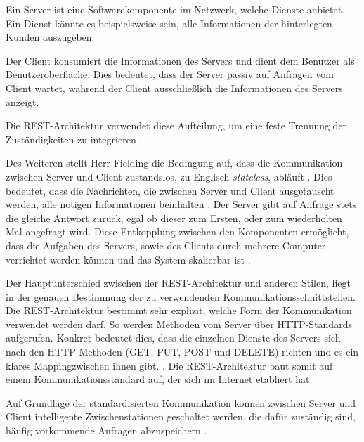 Ein Server ist eine Softwarekomponente im Netzwerk, welche Dienste anbietet. Ein Dienst könnte es beispielsweise sein, alle Informationen der hinterlegten Kunden auszugeben.

Der Client konsumiert die Informationen des Servers und dient dem Benutzer als Benutzeroberfläche. Dies bedeutet, dass der Server passiv auf Anfragen vom Client wartet, während der Client ausschließlich die Informationen des Servers anzeigt. 

Die REST-Architektur verwendet diese Aufteilung, um eine feste Trennung der Zuständigkeiten zu integrieren \parencite[vgl.][S. 78]{fielding_architectural_2000}.

Des Weiteren stellt Herr Fielding die Bedingung auf, dass die Kommunikation zwischen Server und Client zustandslos, zu Englisch \textit{stateless}, abläuft \parencite[][S. 78]{fielding_architectural_2000}. Dies bedeutet, dass die Nachrichten, die zwischen Server und Client ausgetauscht werden, alle nötigen Informationen beinhalten \parencite[][S. 128]{starke_effektive_2015}. Der Server gibt auf Anfrage stets die gleiche Antwort zurück, egal ob dieser zum Ersten, oder zum wiederholten Mal angefragt wird. Diese Entkopplung zwischen den Komponenten ermöglicht, dass die Aufgaben des Servers, sowie des Clients durch mehrere Computer verrichtet werden können und das System skalierbar ist \parencite[][S. 79]{fielding_architectural_2000}.

Der Hauptunterschied zwischen der REST-Architektur und anderen Stilen, liegt in der genauen Bestimmung der zu verwendenden Kommunikationsschnittstellen. Die REST-Architektur bestimmt sehr explizit, welche Form der Kommunikation verwendet werden darf. So werden Methoden vom Server über HTTP-Standards aufgerufen. Konkret bedeutet dies, dass die einzelnen Dienste des Servers sich nach den HTTP-Methoden (GET, PUT, POST und DELETE) richten und es ein klares Mapping\footnotemark zwischen ihnen gibt. \parencite[vgl.][S. 128]{starke_effektive_2015}. Die REST-Architektur baut somit auf einem Kommunikationsstandard auf, der sich im Internet etabliert hat.


Auf Grundlage der standardisierten Kommunikation können zwischen Server und Client intelligente Zwischenstationen geschaltet werden, die dafür zuständig sind, häufig vorkommende Anfragen abzuspeichern \parencites[vgl.][S. 79 f.]{fielding_architectural_2000}[][S. 128]{starke_effektive_2015}.

